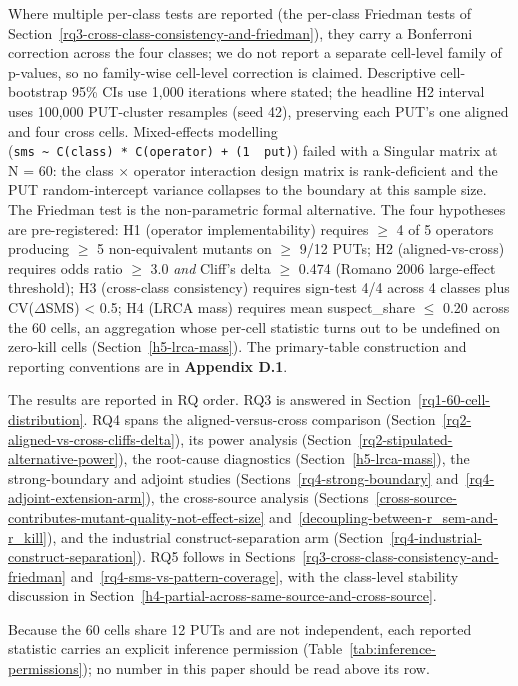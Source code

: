 \documentclass[manuscript,screen,review]{acmart}
\begin{document}
Where multiple per-class tests are reported (the per-class Friedman tests
of Section~\ref{rq3-cross-class-consistency-and-friedman}), they carry a Bonferroni correction across the four classes; we
do not report a separate cell-level family of p-values, so no family-wise
cell-level correction is claimed. Descriptive cell-bootstrap 95\% CIs
use 1,000 iterations where stated; the headline H2 interval uses
100,000 PUT-cluster resamples (seed 42), preserving each PUT's one
aligned and four cross cells. Mixed-effects
modelling
(\texttt{sms\ \textasciitilde{}\ C(class)\ *\ C(operator)\ +\ (1\ \textbar{}\ put)})
failed with a Singular matrix at N = 60: the class $\times$ operator
interaction design matrix is rank-deficient and the PUT random-intercept
variance collapses to the boundary at this sample size. The Friedman test
is the non-parametric formal alternative. The four hypotheses are
pre-registered: H1 (operator implementability) requires $\geq$ 4 of 5
operators producing $\geq$ 5 non-equivalent mutants on $\geq$ 9/12 PUTs; H2
(aligned-vs-cross) requires odds ratio $\geq$ 3.0 \emph{and} Cliff's delta $\geq$
0.474 (Romano 2006 large-effect threshold); H3 (cross-class consistency)
requires sign-test 4/4 across 4 classes plus CV($\Delta$SMS) \textless{} 0.5;
H4 (LRCA mass) requires mean suspect\_share $\leq$ 0.20 across the 60
cells, an aggregation whose per-cell statistic turns out to be undefined
on zero-kill cells (Section~\ref{h5-lrca-mass}). The primary-table
construction and reporting conventions are in
\textbf{Appendix D.1}.

The results are reported in RQ order. RQ3 is answered in
Section~\ref{rq1-60-cell-distribution}. RQ4 spans the aligned-versus-cross
comparison (Section~\ref{rq2-aligned-vs-cross-cliffs-delta}), its power
analysis (Section~\ref{rq2-stipulated-alternative-power}), the root-cause
diagnostics (Section~\ref{h5-lrca-mass}), the strong-boundary and adjoint
studies (Sections~\ref{rq4-strong-boundary} and~\ref{rq4-adjoint-extension-arm}),
the cross-source analysis
(Sections~\ref{cross-source-contributes-mutant-quality-not-effect-size}
and~\ref{decoupling-between-r_sem-and-r_kill}), and the industrial
construct-separation arm
(Section~\ref{rq4-industrial-construct-separation}). RQ5 follows in
Sections~\ref{rq3-cross-class-consistency-and-friedman}
and~\ref{rq4-sms-vs-pattern-coverage}, with the class-level stability
discussion in Section~\ref{h4-partial-across-same-source-and-cross-source}.

Because the 60 cells share 12 PUTs and are not independent, each
reported statistic carries an explicit inference permission
(Table~\ref{tab:inference-permissions}); no number in this paper should
be read above its row.
\end{document}
